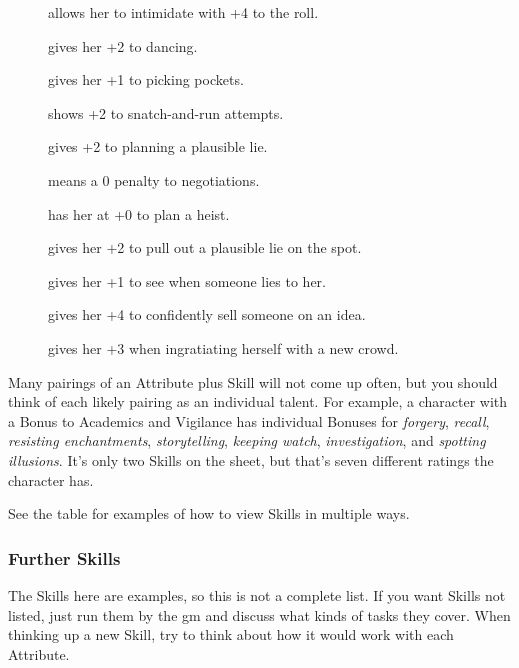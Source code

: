 \begin{multicols}{2}
\begin{description}
  \item[]
    allows her to intimidate with +4 to the roll.
  \item[]
    gives her +2 to dancing.
  \item[]
    gives her +1 to picking pockets.
  \item[]
    shows +2 to snatch-and-run attempts.
  \item[]
    gives +2 to planning a plausible lie.
  \item[]
    means a 0 penalty to negotiations.
  \item[]
    has her at +0 to plan a heist.
  \item[]
    gives her +2 to pull out a plausible lie on the spot.
  \item[]
    gives her +1 to see when someone lies to her.
  \item[]
    gives her +4 to confidently sell someone on an idea.
  \item[]
    gives her +3 when ingratiating herself with a new crowd.
\end{description}

Many pairings of an Attribute plus Skill will not come up often, but you should think of each likely pairing as an individual talent.
For example, a character with a Bonus to Academics and Vigilance has individual Bonuses for \textit{forgery}, \textit{recall}, \textit{resisting enchantments}, \textit{storytelling}, \textit{keeping watch}, \textit{investigation}, and \textit{spotting illusions}.
It's only two Skills on the sheet, but that's seven different ratings the character has.

See the table  for examples of how to view Skills in multiple ways.

\bigSkillsTable

\subsubsection{Further Skills}

The Skills here are examples, so this is not a complete list.
If you want Skills not listed, just run them by the \gls{gm} and discuss what kinds of tasks they cover.
When thinking up a new Skill, try to think about how it would work with each Attribute.


\end{multicols}
